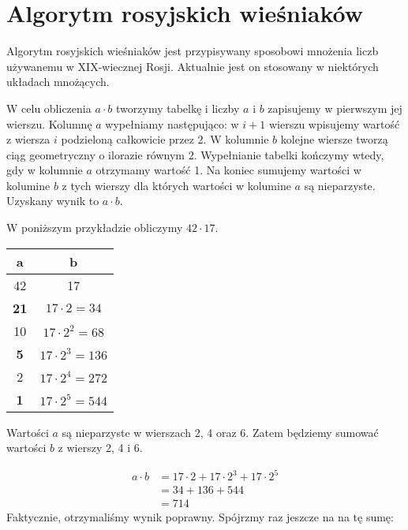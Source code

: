 \section{Algorytm rosyjskich wieśniaków}



Algorytm rosyjskich wieśniaków jest przypisywany sposobowi mnożenia liczb używanemu w XIX-wiecznej Rosji.
Aktualnie jest on stosowany w niektórych układach mnożących.

W celu obliczenia $a \cdot b$ tworzymy tabelkę i liczby $a$ i $b$ zapisujemy w pierwszym jej wierszu.
Kolumnę $a$ wypełniamy następująco: w $i+1$ wierszu wpisujemy wartość z wiersza $i$ podzieloną całkowicie przez 2.
W kolumnie $b$ kolejne wiersze tworzą ciąg geometryczny o ilorazie równym 2.
Wypełnianie tabelki kończymy wtedy, gdy w kolumnie $a$ otrzymamy wartość 1.
Na koniec sumujemy wartości w kolumine $b$ z tych wierszy dla których wartości w kolumine $a$ są nieparzyste.
Uzyskany wynik to $a \cdot b$.

W poniższym przykładzie obliczymy $42 \cdot 17$.

\begin{center}
\begin{tabular}{ c|c } 

 a & b \\ 
 \hline
 42 & 17 \\ 
 \textbf{21} & $17 \cdot 2 = 34$ \\
 10 & $17 \cdot 2^2 = 68$ \\
 \textbf{5}  & $17 \cdot 2^3 = 136$ \\
 2  & $17 \cdot 2^4 = 272$ \\
 \textbf{1}  & $17 \cdot 2^5 = 544$ \\

\end{tabular}
\end{center}
Wartości $a$ są nieparzyste w wierszach 2, 4 oraz 6. Zatem będziemy sumować wartości $b$ z wierszy 2, 4 i 6.

\begin{equation*} 
\begin{split}
a \cdot b &= 17\cdot2 + 17\cdot2^3 + 17\cdot2^5 \\
&= 34 + 136 + 544 \\
&= 714
\end{split}
\end{equation*}
Faktycznie, otrzymaliśmy wynik poprawny. Spójrzmy raz jeszcze na na tę sumę:

